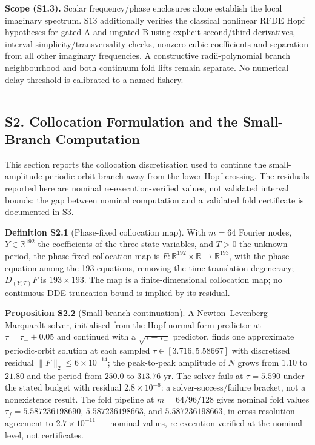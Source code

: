 \documentclass[
  10pt,
  a4paper,
]{article}
\begin{document}
\textbf{Scope (S1.3).} Scalar frequency/phase enclosures alone establish
the local imaginary spectrum. S13 additionally verifies the classical
nonlinear RFDE Hopf hypotheses for gated A and ungated B using explicit
second/third derivatives, interval simplicity/transversality checks,
nonzero cubic coefficients and separation from all other imaginary
frequencies. A constructive radii-polynomial branch neighbourhood and
both continuum fold lifts remain separate. No numerical delay threshold
is calibrated to a named fishery.

\begin{center}\rule{0.5\linewidth}{0.5pt}\end{center}

\subsection{S2. Collocation Formulation and the Small-Branch
Computation}\label{s2.-collocation-formulation-and-the-small-branch-computation}

This section reports the collocation discretisation used to continue the
small-amplitude periodic orbit branch away from the lower Hopf crossing.
The residuals reported here are nominal re-execution-verified values,
not validated interval bounds; the gap between nominal computation and a
validated fold certificate is documented in S3.

\textbf{Definition S2.1} (Phase-fixed collocation map). With \(m = 64\)
Fourier nodes, \(Y \in \mathbb{R}^{192}\) the coefficients of the three
state variables, and \(T > 0\) the unknown period, the phase-fixed
collocation map is
\(F : \mathbb{R}^{192} \times \mathbb{R} \to \mathbb{R}^{193}\), with
the phase equation among the 193 equations, removing the
time-translation degeneracy; \(D_{(Y,T)}F\) is \(193 \times 193\). The
map is a finite-dimensional collocation map; no continuous-DDE
truncation bound is implied by its residual.

\textbf{Proposition S2.2} (Small-branch continuation). A
Newton--Levenberg--Marquardt solver, initialised from the Hopf
normal-form predictor at \(\tau = \tau_- + 0.05\) and continued with a
\(\sqrt{\tau - \tau_-}\) predictor, finds one approximate periodic-orbit
solution at each sampled \(\tau \in [3.716, 5.58667]\) with discretised
residual \(\|F\|_2 \le 6\times10^{-14}\); the peak-to-peak amplitude of
\(N\) grows from \(1.10\) to \(21.80\) and the period from \(250.0\) to
\(313.76\) yr. The solver fails at \(\tau = 5.590\) under the stated
budget with residual \(2.8\times10^{-6}\): a solver-success/failure
bracket, not a nonexistence result. The fold pipeline at
\(m = 64/96/128\) gives nominal fold values \(\tau_f = 5.587236198690\),
\(5.587236198663\), and \(5.587236198663\), in cross-resolution
agreement to \(2.7\times10^{-11}\) --- nominal values,
re-execution-verified at the nominal level, not certificates.
\end{document}
